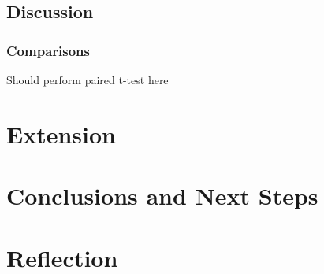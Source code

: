 \documentclass[12pt]{article}
\begin{document}
\subsection{Discussion}
\subsubsection{Comparisons}
Should perform paired t-test here
\section{Extension}

\section{Conclusions and Next Steps}

\section{Reflection}



\end{document}
